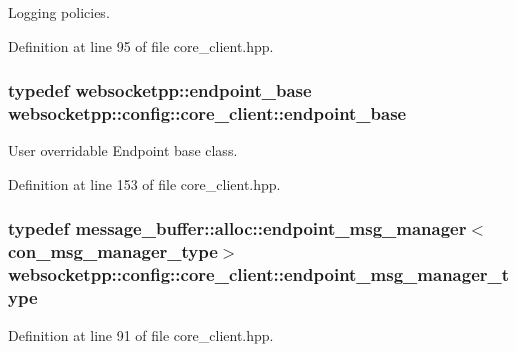 Logging policies. 



Definition at line 95 of file core\+\_\+client.\+hpp.

\hypertarget{structwebsocketpp_1_1config_1_1core__client_a119692ecc6508696e567430caeb0e798}{}
\subsubsection[{endpoint\+\_\+base}]{\setlength{\rightskip}{0pt plus 5cm}typedef {\bf websocketpp\+::endpoint\+\_\+base} {\bf websocketpp\+::config\+::core\+\_\+client\+::endpoint\+\_\+base}}\label{structwebsocketpp_1_1config_1_1core__client_a119692ecc6508696e567430caeb0e798}


User overridable Endpoint base class. 



Definition at line 153 of file core\+\_\+client.\+hpp.

\hypertarget{structwebsocketpp_1_1config_1_1core__client_a1ccd94e4f4d1102cdb81b98284ed1166}{}
\subsubsection[{endpoint\+\_\+msg\+\_\+manager\+\_\+type}]{\setlength{\rightskip}{0pt plus 5cm}typedef {\bf message\+\_\+buffer\+::alloc\+::endpoint\+\_\+msg\+\_\+manager}$<${\bf con\+\_\+msg\+\_\+manager\+\_\+type}$>$ {\bf websocketpp\+::config\+::core\+\_\+client\+::endpoint\+\_\+msg\+\_\+manager\+\_\+type}}\label{structwebsocketpp_1_1config_1_1core__client_a1ccd94e4f4d1102cdb81b98284ed1166}


Definition at line 91 of file core\+\_\+client.\+hpp.

\hypertarget{structwebsocketpp_1_1config_1_1core__client_ae370adc4110d5d6c709167462467b11c}{}
